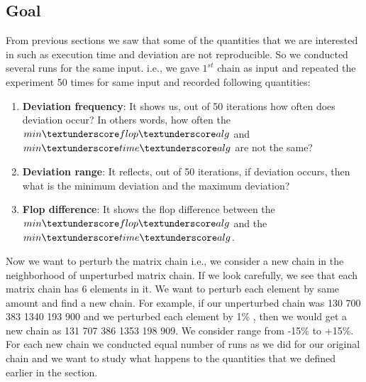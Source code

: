 \documentclass[10pts]{article}
\begin{document}
\subsection*{Goal}
From previous sections we saw that some of the quantities that we are interested in such as execution time and deviation  are not reproducible. So we conducted several runs for the same input. i.e., we gave $1^{st}$ chain as input and repeated the experiment 50 times for same input and recorded following quantities:
		\begin{enumerate}[(\roman{*})] 
				\item \textbf{Deviation frequency}: It shows us, out of 50 iterations how often does deviation occur? In others words, how often the  $min\textunderscore flop\textunderscore alg$ and  $min\textunderscore time\textunderscore alg$ are not the same?
	            \item \textbf{Deviation range}: It reflects, out of 50 iterations, if deviation occurs, then what is the minimum deviation and the maximum deviation? 
	
				\item \textbf{Flop difference}: It shows the flop difference between the  $min\textunderscore flop\textunderscore alg$ and  the $min\textunderscore time\textunderscore alg$. 
	   \end{enumerate}
	   Now we want to perturb the  matrix chain i.e., we consider a new chain in the neighborhood of unperturbed matrix chain. If we look carefully, we see that each matrix chain has 6 elements in it. We want to perturb each element by same amount and find a new chain. For example, if our unperturbed chain was 130 700 383 1340 193 900 and we perturbed each element by 1\% , then we would get a new chain as 131 707 386 1353 198 909. We consider range from -15\% to +15\%. For each new chain we conducted equal number of runs as we did for our original chain and we want to study what happens to the quantities that we defined earlier in the section.
\end{document}
